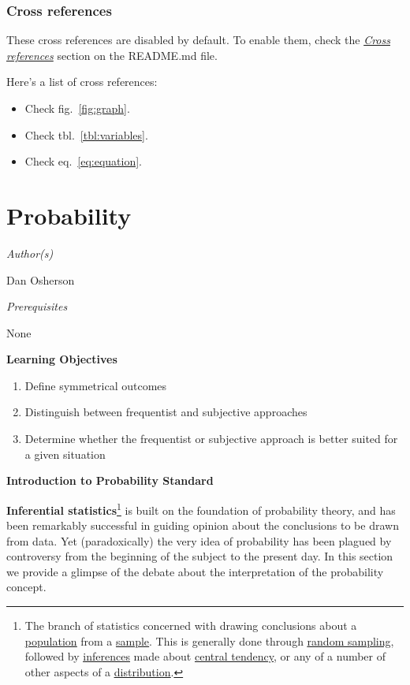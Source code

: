 \documentclass[
  11pt,
,
onecolumn,
openany
]{book}
\providecommand{\tightlist}{%
  \setlength{\itemsep}{0pt}\setlength{\parskip}{0pt}}
\begin{document}
\hypertarget{cross-references}{%
\subsection{Cross references}\label{cross-references}}

These cross references are disabled by default. To enable them, check the
\emph{\href{https://github.com/wikiti/pandoc-book-template\#cross-references}{Cross
references}} section on the README.md file.

Here's a list of cross references:

\begin{itemize}
\tightlist
\item
  Check fig.~\ref{fig:graph}.
\item
  Check tbl.~\ref{tbl:variables}.
\item
  Check eq.~\ref{eq:equation}.
\end{itemize}

\hypertarget{probability}{%
\chapter{Probability}\label{probability}}

\emph{Author(s)}

Dan Osherson

\emph{Prerequisites}

None

\textbf{Learning Objectives}

\begin{enumerate}
\def\labelenumi{\arabic{enumi}.}
\item
  Define symmetrical outcomes
\item
  Distinguish between frequentist and subjective approaches
\item
  Determine whether the frequentist or subjective approach is better suited
  for a given situation
\end{enumerate}

\textbf{Introduction to Probability Standard}

\textbf{Inferential statistics}\footnote{The branch of statistics concerned
  with drawing conclusions about a
  \href{https://onlinestatbook.com/2/glossary/population.html}{\underline{population}}
  from a
  \href{https://onlinestatbook.com/2/glossary/sample.html}{\underline{sample}}.
  This is generally done through
  \href{https://onlinestatbook.com/2/glossary/random_sampling.html}{\underline{random
  sampling}}, followed by
  \href{https://onlinestatbook.com/2/glossary/inference.html}{\underline{inferences}}
  made about
  \href{https://onlinestatbook.com/2/glossary/center(distribution).html}{\underline{central
  tendency}}, or any of a number of other aspects of a
  \href{https://onlinestatbook.com/2/glossary/distribution.html}{\underline{distribution}}.}
is built on the foundation of probability theory, and has been remarkably
successful in guiding opinion about the conclusions to be drawn from data. Yet
(paradoxically) the very idea of probability has been plagued by controversy
from the beginning of the subject to the present day. In this section we
provide a glimpse of the debate about the interpretation of the probability
concept.
\end{document}
